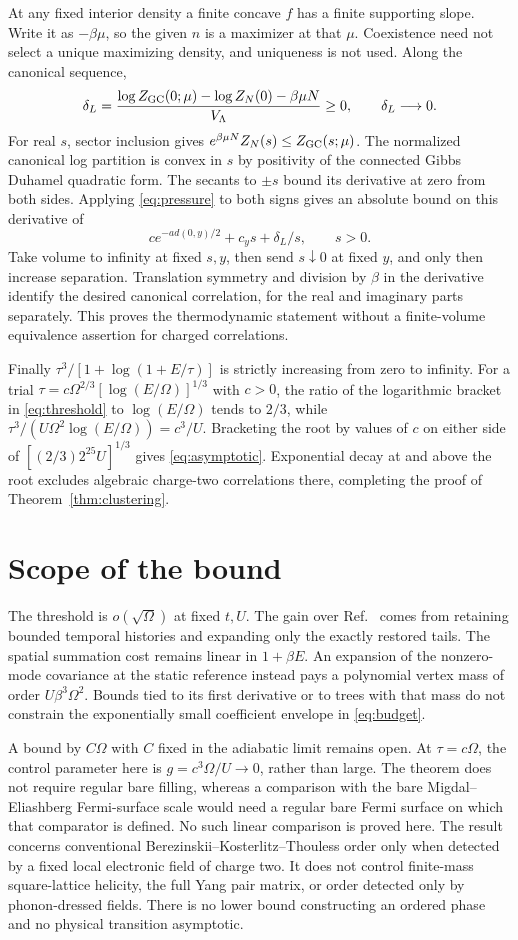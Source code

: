 \documentclass[11pt]{article}
\begin{document}
At any fixed interior density a finite concave $f$ has a finite supporting slope. Write it as $-\beta\mu$, so the given $n$ is a maximizer at that $\mu$. Coexistence need not select a unique maximizing density, and uniqueness is not used. Along the canonical sequence,
\[
 \delta_L=\frac{\log Z_{\rm GC}(0;\mu)-\log Z_N(0)-\beta\mu N}{V_\Lambda}
 \ge0,\qquad \delta_L\longrightarrow0.
\]
For real $s$, sector inclusion gives $e^{\beta\mu N}Z_N(s)\le Z_{\rm GC}(s;\mu)$. The normalized canonical log partition is convex in $s$ by positivity of the connected Gibbs Duhamel quadratic form. The secants to $\pm s$ bound its derivative at zero from both sides. Applying \eqref{eq:pressure} to both signs gives an absolute bound on this derivative of
\[
 c e^{-a d(0,y)/2}+c_y s+\delta_L/s,\qquad s>0.
\]
Take volume to infinity at fixed $s,y$, then send $s\downarrow0$ at fixed $y$, and only then increase separation. Translation symmetry and division by $\beta$ in the derivative identify the desired canonical correlation, for the real and imaginary parts separately. This proves the thermodynamic statement without a finite-volume equivalence assertion for charged correlations.

Finally $\tau^3/[1+\log(1+E/\tau)]$ is strictly increasing from zero to infinity. For a trial $\tau=c\Omega^{2/3}[\log(E/\Omega)]^{1/3}$ with $c>0$, the ratio of the logarithmic bracket in \eqref{eq:threshold} to $\log(E/\Omega)$ tends to $2/3$, while $\tau^3/(U\Omega^2\log(E/\Omega))=c^3/U$. Bracketing the root by values of $c$ on either side of $[(2/3)2^{25}U]^{1/3}$ gives \eqref{eq:asymptotic}. Exponential decay at and above the root excludes algebraic charge-two correlations there, completing the proof of Theorem~\ref{thm:clustering}.

\section{Scope of the bound}
The threshold is $o(\sqrt\Omega)$ at fixed $t,U$. The gain over Ref.~\cite{slow} comes from retaining bounded temporal histories and expanding only the exactly restored tails. The spatial summation cost remains linear in $1+\beta E$. An expansion of the nonzero-mode covariance at the static reference instead pays a polynomial vertex mass of order $U\beta^3\Omega^2$. Bounds tied to its first derivative or to trees with that mass do not constrain the exponentially small coefficient envelope in \eqref{eq:budget}.

A bound by $C\Omega$ with $C$ fixed in the adiabatic limit remains open. At $\tau=c\Omega$, the control parameter here is $g=c^3\Omega/U\to0$, rather than large. The theorem does not require regular bare filling, whereas a comparison with the bare Migdal--Eliashberg Fermi-surface scale would need a regular bare Fermi surface on which that comparator is defined. No such linear comparison is proved here. The result concerns conventional Berezinskii--Kosterlitz--Thouless order only when detected by a fixed local electronic field of charge two. It does not control finite-mass square-lattice helicity, the full Yang pair matrix, or order detected only by phonon-dressed fields. There is no lower bound constructing an ordered phase and no physical transition asymptotic.
\end{document}
